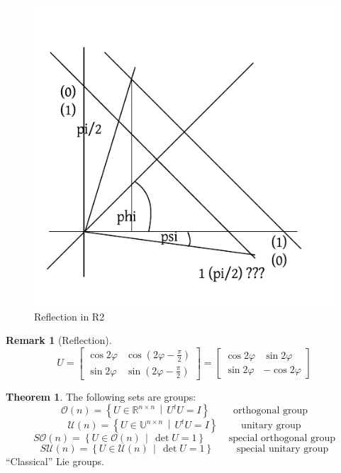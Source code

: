 \documentclass[a4paper,landscape,twocolumn]{article}
\newcommand\setdef[2]{\left\{#1\,\middle|\,#2\right\}}
\theoremstyle{definition}
\newtheorem{theorem}{Theorem}
\newtheorem{rem}{Remark}
\begin{document}
\begin{figure}[!h]
  \begin{center}
    \includegraphics{img/reflection_in_r2.pdf}
    \caption{Reflection in R2}
    \label{img:refl-r2}
  \end{center}
\end{figure}

\begin{rem}[Reflection]
  \[
    U = \begin{bmatrix}
      \cos{2\varphi} & \cos(2\varphi - \frac\pi2) \\
      \sin{2\varphi} & \sin(2\varphi - \frac\pi2)
    \end{bmatrix} = \begin{bmatrix}
      \cos{2\varphi} & \sin{2\varphi} \\
      \sin{2\varphi} & -\cos{2\varphi}
    \end{bmatrix}
  \]
\end{rem}

\begin{theorem}
  \label{satz-8.73}
  The following sets are groups:
  \[ \mathcal O(n) = \setdef{U \in \mathbb R^{n \times n}}{U^t U = I} \qquad \text{ orthogonal group} \]
  \[ \mathcal U(n) = \setdef{U \in \mathbb U^{n \times n}}{U^t U = I} \qquad \text{ unitary group} \]
  \[ S\mathcal O(n) = \setdef{U \in \mathcal O(n)}{\det{U} = 1} \qquad \text{ special orthogonal group} \]
  \[ S\mathcal U(n) = \setdef{U \in \mathcal U(n)}{\det{U} = 1} \qquad \text{ special unitary group} \]
  \enquote{Classical} Lie groups.
\end{theorem}
\end{document}
